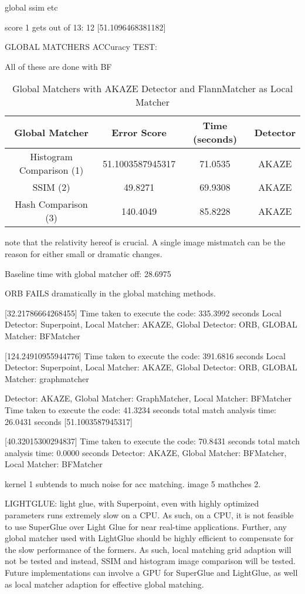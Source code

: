 global ssim etc

score 1 gets out of 13: 12  [51.1096468381182]

GLOBAL MATCHERS ACCuracy TEST:

All of these are done with BF
\begin{table}[H]
    \centering
    \begin{tabular}{|c|c|c|c|}
    \hline
    \textbf{Global Matcher} & \textbf{Error Score} & \textbf{Time (seconds)} & \textbf{Detector} \\ \hline
    Histogram Comparison (1) & 51.1003587945317 &  71.0535 & AKAZE \\ \hline
    SSIM (2)                 & 49.8271 & 69.9308 & AKAZE \\ \hline
    Hash Comparison (3)      & 140.4049 & 85.8228 & AKAZE \\ \hline
    \end{tabular}
    \caption{Global Matchers with AKAZE Detector and FlannMatcher as Local Matcher}
    \end{table}


note that the relativity hereof is crucial. A single image mistmatch can be the reason for either small or dramatic changes. 

Baseline time with global matcher off: 28.6975
    

ORB FAILS dramatically in the global matching methods. 



[32.21786664268455]
Time taken to execute the code: 335.3992 seconds
Local Detector: Superpoint, Local Matcher: AKAZE, Global Detector: ORB, GLOBAL Matcher: BFMatcher


[124.24910955944776]
Time taken to execute the code: 391.6816 seconds
Local Detector: Superpoint, Local Matcher: AKAZE, Global Detector: ORB, GLOBAL Matcher: graphmatcher



Detector: AKAZE, Global Matcher: GraphMatcher, Local Matcher: BFMatcher
Time taken to execute the code: 41.3234 seconds
total match analysis time: 26.0431 seconds
[51.1003587945317]




[40.32015300294837]
Time taken to execute the code: 70.8431 seconds
total match analysis time: 0.0000 seconds
Detector: AKAZE, Global Matcher: BFMatcher, Local Matcher: BFMatcher

kernel 1 subtends to much noise for acc matching. image 5 mathches 2. 

LIGHTGLUE:
light glue, with Superpoint, even with highly optimized parameters runs extremely slow on a CPU. As such, on a CPU, it is not feasible to use SuperGlue over Light Glue for near real-time applications. Further, any global matcher used with LightGlue should be highly efficient to compensate for the slow performance of the formers. As such, local matching grid adaption will not be tested and instead, SSIM and histogram image comparison will be tested. Future implementations can involve a GPU for SuperGlue and LightGlue, as well as local matcher adaption for effective global matching. 

